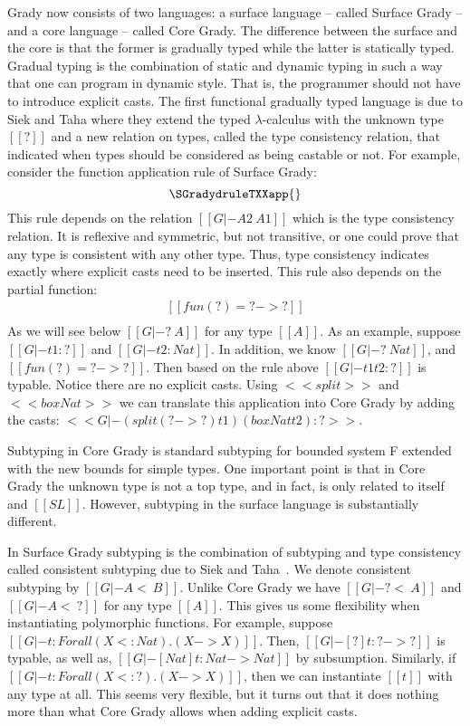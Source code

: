 Grady now consists of two languages: a surface language -- called
Surface Grady -- and a core language -- called Core Grady. The
difference between the surface and the core is that the former is
gradually typed while the latter is statically typed. Gradual typing
is the combination of static and dynamic typing in such a way that one
can program in dynamic style.  That is, the programmer should not have
to introduce explicit casts. The first functional gradually typed
language is due to Siek and Taha \cite{Siek:2006} where they extend
the typed $\lambda$-calculus with the unknown type $[[?]]$ and a new
relation on types, called the type consistency relation, that indicated
when types should be considered as being castable or not.  For
example, consider the function application rule of Surface Grady:
\[
\SGradydruleTXXapp{}
\]
This rule depends on the relation $[[G |- A2 ~ A1]]$ which is the type
consistency relation.  It is reflexive and symmetric, but not
transitive, or one could prove that any type is consistent with any
other type.  Thus, type consistency indicates exactly where explicit
casts need to be inserted.  This rule also depends on the partial
function:
\[
\begin{array}{lll}
  [[fun(?) = ? -> ?]]\\
  [[fun(A1 -> B1) = A1 -> B1]]
\end{array}
\]
As we will see below $[[G |- ? ~ A]]$ for any type $[[A]]$.  As an
example, suppose $[[G |- t1 : ?]]$ and $[[G |- t2 : Nat]]$.  In addition, we know
$[[G |- ? ~ Nat]]$, and $[[fun(?) = ? -> ?]]$.
Then
based on the rule above $[[G |- t1 t2 : ?]]$ is typable.  Notice
there are no explicit casts.  Using $<<split>>$ and $<<box Nat>>$ we
can translate this application into Core Grady by adding the casts:
$<<G |- (split (? -> ?) t1) (box Nat t2) : ?>>$.

Subtyping in Core Grady is standard subtyping for bounded system F
extended with the new bounds for simple types.  One important point is
that in Core Grady the unknown type is not a top type, and in fact, is
only related to itself and $[[SL]]$.  However, subtyping in the
surface language is substantially different.

In Surface Grady subtyping is the combination of subtyping and type
consistency called consistent subtyping due to
Siek and Taha~\cite{Siek:2007}.  We denote consistent subtyping by $[[G |-
    A <~ B]]$.  Unlike Core Grady we have $[[G |- ? <~ A]]$ and $[[G
    |- A <~ ?]]$ for any type $[[A]]$.  This gives us some flexibility
when instantiating polymorphic functions.  For example, suppose $[[G
    |- t : Forall (X <: Nat).(X -> X)]]$.  Then, $[[G |- [?]t : ? ->
    ?]]$ is typable, as well as, $[[G |- [Nat]t : Nat -> Nat]]$ by
subsumption.  Similarly, if $[[G |- t : Forall (X <: ?).(X -> X)]]$,
then we can instantiate $[[t]]$ with any type at all.  This seems very
flexible, but it turns out that it does nothing more than what Core
Grady allows when adding explicit casts.

